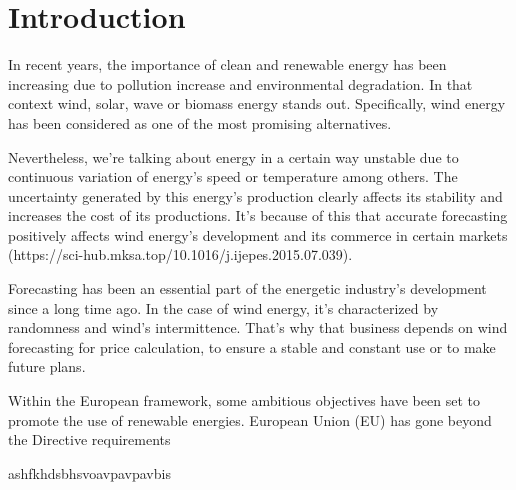 \section{Introduction}

In recent years, the importance of clean and renewable energy has been increasing due to pollution increase and environmental degradation. In that context wind, solar, wave or biomass energy stands out. Specifically, wind energy has been considered as one of the most promising alternatives.

Nevertheless, we’re talking about energy in a certain way unstable due to continuous variation of energy’s speed or  temperature among others. The uncertainty generated by this energy’s production clearly affects its stability and increases the cost of its productions. It’s because of this that accurate forecasting  positively affects wind energy’s development and its commerce in certain markets (https://sci-hub.mksa.top/10.1016/j.ijepes.2015.07.039).

Forecasting has been an essential part of the energetic industry’s development since a long time ago. In the case of wind energy, it’s characterized by randomness and wind’s intermittence. That’s why that business depends on wind forecasting for price calculation, to ensure a stable and constant use or to make future plans.

Within the European framework, some ambitious objectives have been set to promote the use of renewable energies. European Union (EU) has gone beyond the Directive requirements

ashfkhdsbhsvoavpavpavbis